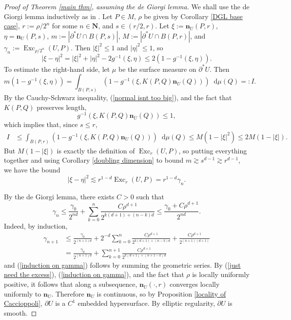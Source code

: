 \documentclass[reqno,11pt]{amsart}
\newcommand{\NN}{\mathbf{N}}
\DeclareMathOperator{\Exc}{Exc}
\newcommand*\dif{\mathop{}\!\mathrm{d}}
\newcommand{\normal}{\mathbf n}
\theoremstyle{definition}
\numberwithin{equation}{section}
\begin{document}
\begin{proof}[Proof of Theorem \ref{main thm}, assuming the de Giorgi lemma]
We shall use the de Giorgi lemma inductively as in \cite[Theorem 8.2]{Giusti77}.
Let $P \in M$, $\rho$ be given by Corollary \ref{DGL base case}, $r := \rho/2^n$ for some $n \in \NN$, and $s \in (r/2, r)$.
Let
$\xi := \normal_U(P, r)$, $\eta = \normal_U(P, s)$, $m := |\partial^* U \cap B(P, s)|$, $M := |\partial^* U \cap B(P, r)|$, and $\gamma_n := \Exc_{\rho/2^n}(U, P)$.
Then $|\xi|^2 \leq 1$ and $|\eta|^2 \leq 1$, so
$$|\xi - \eta|^2 = |\xi|^2 + |\eta|^2 - 2 g^{-1}(\xi, \eta) \leq 2(1 - g^{-1}(\xi, \eta)).$$
To estimate the right-hand side, let $\mu$ be the surface measure on $\partial^* U$. Then
$$m(1 - g^{-1}(\xi, \eta)) = \int_{B(P, s)} (1 - g^{-1}(\xi, K(P, Q) \normal_U(Q))) \dif \mu(Q) =: I.$$
By the Cauchy-Schwarz inequality, (\ref{normal isnt too big}), and the fact that $K(P, Q)$ preserves length,
$$g^{-1}(\xi, K(P, Q) \normal_U(Q)) \leq 1,$$
which implies that, since $s \leq r$,
\begin{align*}
I
&\leq \int_{B(P, r)} (1 - g^{-1}(\xi, K(P, Q) \normal_U(Q))) \dif \mu(Q) 
\leq M(1 - |\xi|^2) \leq 2M(1 - |\xi|).
\end{align*}
But $M(1 - |\xi|)$ is exactly the definition of $\Exc_r(U, P)$, so putting everything together and using Corollary \ref{doubling dimension} to bound $m \gtrsim s^{d - 1} \gtrsim r^{d - 1}$, we have the bound
\begin{equation}\label{just need the excess}
|\xi - \eta|^2 \lesssim r^{1 - d} \Exc_r(U, P) = r^{1 - d} \gamma_n.
\end{equation}

By the de Giorgi lemma, there exists $C > 0$ such that
\begin{equation}\label{induction on gamma}
\gamma_n \leq \frac{\gamma_0}{2^{nd}} + \sum_{k=0}^n \frac{C\rho^{d + 1}}{2^{k(d + 1) + (n - k)d}} \leq \frac{\gamma_0 + C\rho^{d + 1}}{2^{nd}}.
\end{equation}
Indeed, by induction,
\begin{align*}
\gamma_{n + 1}
&\leq \frac{\gamma_0}{2^{(n + 1)d}} + 2^{-d} \sum_{k=0}^n \frac{C\rho^{d + 1}}{2^{k(d + 1) + (n - k)d}} + \frac{C\rho^{d + 1}}{2^{(n + 1)(d + 1)}} \\
&= \frac{\gamma_0}{2^{(n + 1)d}} + \sum_{k=0}^{n + 1} \frac{C\rho^{d + 1}}{2^{k(d + 1) + (n + 1 - k)d}}
\end{align*}
and (\ref{induction on gamma}) follows by summing the geometric series.
By (\ref{just need the excess}), (\ref{induction on gamma}), and the fact that $\rho$ is locally uniformly positive, it follows that along a subsequence, $\normal_U(\cdot, r)$ converges locally uniformly to $\normal_U$.
Therefore $\normal_U$ is continuous, so by Proposition \ref{locality of Caccioppoli}, $\partial U$ is a $C^1$ embedded hypersurface.
By elliptic regularity, $\partial U$ is smooth.


\end{proof}
\end{document}

